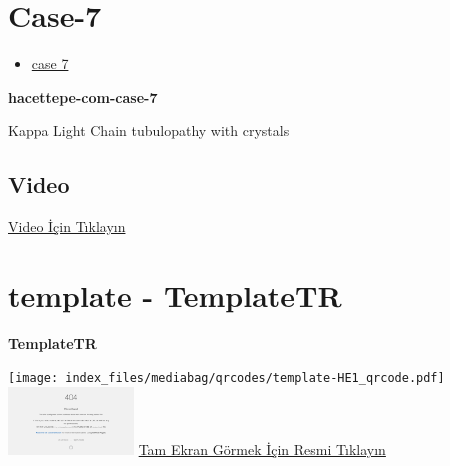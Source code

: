\documentclass[
  letterpaper,
  DIV=11,
  numbers=noendperiod]{scrreprt}
\providecommand{\tightlist}{%
  \setlength{\itemsep}{0pt}\setlength{\parskip}{0pt}}\usepackage{longtable,booktabs,array}
\begin{document}
\hypertarget{sec-hacettepe-case-of-the-month-case-7}{%
\section{Case-7}\label{sec-hacettepe-case-of-the-month-case-7}}

\begin{itemize}
\tightlist
\item
  \href{https://www.youtube.com/watch?v=FU-Fv7kQPdE&ab_channel=KemalKosemehmetoglu}{case
  7}
\end{itemize}

\textbf{hacettepe-com-case-7}

\begin{tcolorbox}[enhanced jigsaw, breakable, opacitybacktitle=0.6, arc=.35mm, colbacktitle=quarto-callout-tip-color!10!white, colback=white, toptitle=1mm, left=2mm, opacityback=0, colframe=quarto-callout-tip-color-frame, titlerule=0mm, rightrule=.15mm, bottomrule=.15mm, toprule=.15mm, bottomtitle=1mm, title=\textcolor{quarto-callout-tip-color}{\faLightbulb}\hspace{0.5em}{Tanı}, coltitle=black, leftrule=.75mm]

Kappa Light Chain tubulopathy with crystals

\end{tcolorbox}

\hypertarget{video-6}{%
\subsection{Video}\label{video-6}}

\href{https://www.youtube.com/watch?v=FU-Fv7kQPdE}{Video İçin Tıklayın}

\hypertarget{sec-template}{%
\section{template - TemplateTR}\label{sec-template}}

\textbf{TemplateTR}

\texttt{[image: index\_files/mediabag/qrcodes/template-HE1\_qrcode.pdf]}
\href{https://images.patolojiatlasi.com/template/HE1.html}{\includegraphics[width=0.25\textwidth,height=\textheight]{./screenshots/thumbnail_template-HE1.png}}
\href{https://images.patolojiatlasi.com/template/HE1.html}{Tam Ekran
Görmek İçin Resmi Tıklayın}
\end{document}
